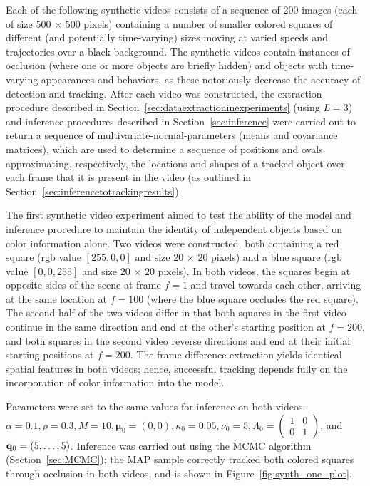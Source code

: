 \documentclass[twocolumn, final]{svjour3}
\begin{document}
Each of the following synthetic videos consists of a sequence of 200 images (each of size $500$ $\times$ $500$ pixels) containing a number of smaller colored squares of different (and potentially time-varying) sizes moving at varied speeds and trajectories over a black background. The synthetic videos contain instances of occlusion (where one or more objects are briefly hidden) and objects with time-varying appearances and behaviors, as these notoriously decrease the accuracy of detection and tracking. After each video was constructed, the extraction procedure described in Section~\ref{sec:dataextractioninexperiments} (using $L=3$) and inference procedures described in Section~\ref{sec:inference} were carried out to return a sequence of multivariate-normal-parameters (means and covariance matrices), which are used to determine a sequence of positions and ovals approximating, respectively, the locations and shapes of a tracked object over each frame that it is present in the video (as outlined in Section~\ref{sec:inferencetotrackingresults}).

The first synthetic video experiment aimed to test the ability of the model and inference procedure to maintain the identity of independent objects based on color information alone. Two videos were constructed, both containing a red square (rgb value $[255,0,0]$ and size $20$ $\times$ $20$ pixels) and a blue square (rgb value $[0,0,255]$ and size $20$ $\times$ $20$ pixels). In both videos, the squares begin at opposite sides of the scene at frame $f=1$ and travel towards each other, arriving at the same location at $f=100$ (where the blue square occludes the red square). The second half of the two videos differ in that both squares in the first video continue in the same direction and end at the other's starting position at $f=200$, and both squares in the second video reverse directions and end at their initial starting positions at $f=200$. The frame difference extraction yields identical spatial features in both videos; hence, successful tracking depends fully on the incorporation of color information into the model.

Parameters were set to the same values for inference on both videos: $\alpha = 0.1, \rho = 0.3, M = 10, \boldsymbol{\mu}_{0} = (0,0), \kappa_{0} = 0.05, \nu_{0} = 5, \Lambda_{0} = \left( \begin{smallmatrix} 1&0\\ 0&1 \end{smallmatrix} \right)$, and $\bold{q}_{0} = (5, \ldots, 5)$. Inference was carried out using the MCMC algorithm (Section~\ref{sec:MCMC}); the MAP sample correctly tracked both colored squares through occlusion in both videos, and is shown in Figure~\ref{fig:synth_one_plot}. 
\end{document}
